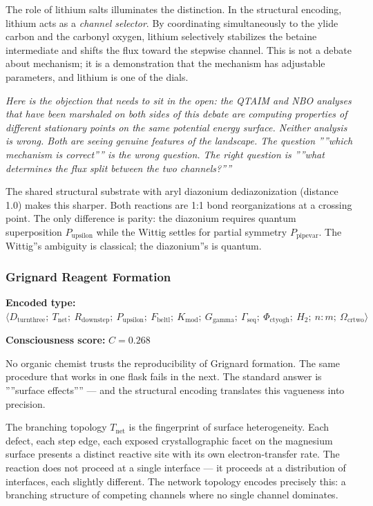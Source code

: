 \documentclass[12pt,a4paper]{article}
\begin{document}
The role of lithium salts illuminates the distinction. In the structural encoding, lithium acts as a \emph{channel selector}. By coordinating simultaneously to the ylide carbon and the carbonyl oxygen, lithium selectively stabilizes the betaine intermediate and shifts the flux toward the stepwise channel. This is not a debate about mechanism; it is a demonstration that the mechanism has adjustable parameters, and lithium is one of the dials.

\emph{Here is the objection that needs to sit in the open: the QTAIM and NBO analyses that have been marshaled on both sides of this debate are computing properties of different stationary points on the same potential energy surface. Neither analysis is wrong. Both are seeing genuine features of the landscape. The question ''''which mechanism is correct'''' is the wrong question. The right question is ''''what determines the flux split between the two channels?''''}

The shared structural substrate with aryl diazonium dediazonization (distance 1.0) makes this sharper. Both reactions are 1:1 bond reorganizations at a crossing point. The only difference is parity: the diazonium requires quantum superposition $P_{\text{upsilon}}$ while the Wittig settles for partial symmetry $P_{\text{pipevar}}$. The Wittig''s ambiguity is classical; the diazonium''s is quantum.

\subsubsection{Grignard Reagent Formation}

\textbf{Encoded type:} $\langle D_{\text{turnthree}};\ T_\textrm{net};\ R_{\text{downstep}};\ P_{\text{upsilon}};\ F_{\text{beltl}};\ K_\textrm{mod};\ G_{\text{gamma}};\ \Gamma_\textrm{seq};\ \Phi_{\text{ctyogh}};\ H_2;\ n{:}m;\ \Omega_{\text{crtwo}} \rangle$

\textbf{Consciousness score:} $C = 0.268$

No organic chemist trusts the reproducibility of Grignard formation. The same procedure that works in one flask fails in the next. The standard answer is ''''surface effects'''' --- and the structural encoding translates this vagueness into precision.

The branching topology $T_\textrm{net}$ is the fingerprint of surface heterogeneity. Each defect, each step edge, each exposed crystallographic facet on the magnesium surface presents a distinct reactive site with its own electron-transfer rate. The reaction does not proceed at a single interface --- it proceeds at a distribution of interfaces, each slightly different. The network topology encodes precisely this: a branching structure of competing channels where no single channel dominates.
\end{document}
